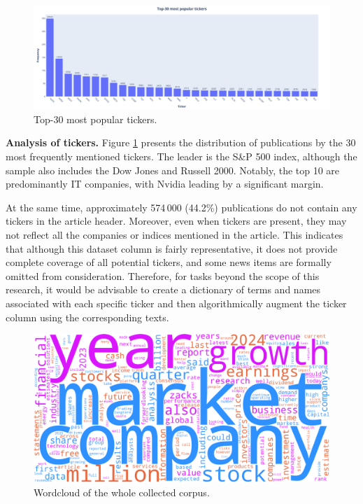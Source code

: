 \begin{figure}[H]
    \centering
    \includegraphics[width=1\linewidth]{img/top30_tickers.png}
    \caption{\label{fig:dist_tickers}Top-30 most popular tickers.}
\end{figure}

\textbf{Analysis of tickers.} Figure \ref{fig:dist_tickers} presents the distribution of publications by the 30 most frequently mentioned
tickers. The leader is the S\&P 500 index, although the sample also includes the Dow Jones and Russell 2000. Notably, the top 10 are predominantly
IT companies, with Nvidia leading by a significant margin.

At the same time, approximately 574\,000 (44.2\%) publications do not contain any tickers in the article header. Moreover, even when tickers
are present, they may not reflect all the companies or indices mentioned in the article. This indicates that although this dataset column
is fairly representative, it does not provide complete coverage of all potential tickers, and some news items are formally omitted
from consideration. Therefore, for tasks beyond the scope of this research, it would be advisable to create a dictionary of terms
and names associated with each specific ticker and then algorithmically augment the ticker column using the corresponding texts.

\begin{figure}[H]
    \centering
    \includegraphics[width=1\linewidth]{img/wordcloud.png}
    \caption{\label{fig:wordcloud}Wordcloud of the whole collected corpus.}
\end{figure}

